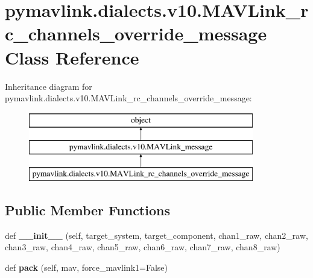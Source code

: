 \hypertarget{classpymavlink_1_1dialects_1_1v10_1_1MAVLink__rc__channels__override__message}{}\section{pymavlink.\+dialects.\+v10.\+M\+A\+V\+Link\+\_\+rc\+\_\+channels\+\_\+override\+\_\+message Class Reference}
\label{classpymavlink_1_1dialects_1_1v10_1_1MAVLink__rc__channels__override__message}
Inheritance diagram for pymavlink.\+dialects.\+v10.\+M\+A\+V\+Link\+\_\+rc\+\_\+channels\+\_\+override\+\_\+message\+:\begin{figure}[H]
\begin{center}
\leavevmode
\includegraphics[height=3.000000cm]{classpymavlink_1_1dialects_1_1v10_1_1MAVLink__rc__channels__override__message}
\end{center}
\end{figure}
\subsection*{Public Member Functions}
\begin{DoxyCompactItemize}
\item 
\mbox{\label{classpymavlink_1_1dialects_1_1v10_1_1MAVLink__rc__channels__override__message_a54eba6855faded1483bda0e1c76b52a4}} 
def {\bfseries \+\_\+\+\_\+init\+\_\+\+\_\+} (self, target\+\_\+system, target\+\_\+component, chan1\+\_\+raw, chan2\+\_\+raw, chan3\+\_\+raw, chan4\+\_\+raw, chan5\+\_\+raw, chan6\+\_\+raw, chan7\+\_\+raw, chan8\+\_\+raw)
\item 
\mbox{\label{classpymavlink_1_1dialects_1_1v10_1_1MAVLink__rc__channels__override__message_abd6b796764a8f20faa942a31d0dfa003}} 
def {\bfseries pack} (self, mav, force\+\_\+mavlink1=False)
\end{DoxyCompactItemize}
